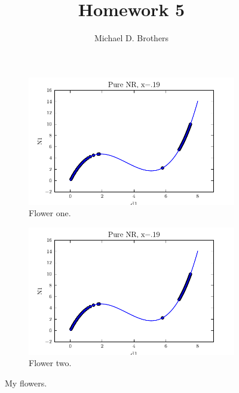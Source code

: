 \documentclass[10pt,letterpaper]{article}
\author{Michael D. Brothers}
\title{Homework 5}
\begin{document}

\begin{figure}[!tbp]
  \begin{subfigure}[b]{1\textwidth}
    \includegraphics[width=\textwidth]{pure_nr_x19.pdf}
    \caption{Flower one.}
    \label{fig:f1}
  \end{subfigure}
  \hfill
  \begin{subfigure}[b]{1\textwidth}
    \includegraphics[width=\textwidth]{pure_nr_x19.pdf}
    \caption{Flower two.}
    \label{fig:f2}
  \end{subfigure}
  \caption{My flowers.}
\end{figure}
\end{document}
